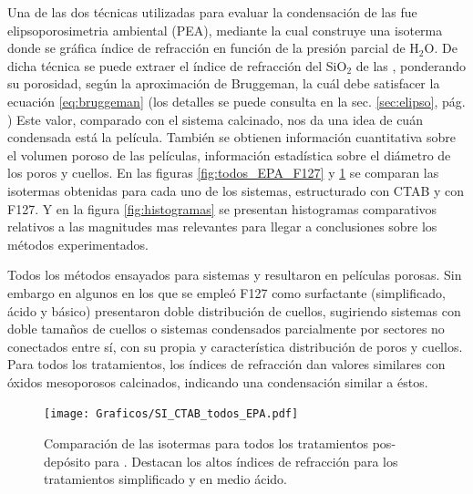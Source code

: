 		Una de las dos técnicas utilizadas para evaluar la condensación de las \pdm\space fue elipsoporosimetria ambiental (PEA), mediante la cual construye una isoterma donde se gráfica índice de refracción en función de la presión parcial de H$_2$O. De dicha técnica se puede extraer el índice de refracción del SiO$_2$ de las \pdm, ponderando su porosidad, según la aproximación de Bruggeman, la cuál debe satisfacer la ecuación \ref{eq:bruggeman} \cite{Bruggeman1935} (los detalles se puede consulta en la sec. \ref{sec:elipso}, pág. \pageref{sec:elipso}) Este valor, comparado con el sistema calcinado, nos da una idea de cuán condensada está la película. También se obtienen información cuantitativa sobre el volumen poroso de las películas, información estadística sobre el diámetro de los poros y cuellos. En las figuras \ref{fig:todos_EPA_F127} y \ref{fig:todos_EPA_CTAB} se comparan las isotermas obtenidas para cada uno de los sistemas, estructurado con CTAB y con F127. Y en la figura \ref{fig:histogramas} se presentan histogramas comparativos relativos a las magnitudes mas relevantes para llegar a conclusiones sobre los métodos experimentados.

		Todos los métodos ensayados para sistemas \pdmF\space y \pdmC resultaron en películas porosas. Sin embargo en algunos en los que se empleó F127 como surfactante (simplificado, ácido y básico) presentaron doble distribución de cuellos, sugiriendo sistemas con doble tamaños de cuellos o sistemas condensados parcialmente por sectores no conectados entre sí, con su propia y característica distribución de poros y cuellos. Para todos los tratamientos, los índices de refracción dan valores similares con óxidos mesoporosos calcinados, indicando una condensación similar a éstos. 


			\begin{figure}[bh!]
		 	   	   \begin{center}
		 	   	   \texttt{[image: Graficos/SI\_CTAB\_todos\_EPA.pdf]}
			   	   \caption[Comparación PEA tratamientos alternativos (CTAB)]{Comparación de las isotermas para todos los tratamientos pos-depósito para \pdmC\space. Destacan los altos índices de refracción para los tratamientos simplificado y en medio ácido.}
				   \label{fig:todos_EPA_CTAB}	
				   \end{center}
				   \end{figure}
			
